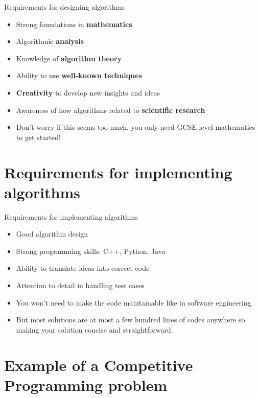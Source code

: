 \documentclass{beamer}
\begin{document}
\begin{frame}{Requirements for designing algorithms}
    \begin{itemize}
        \item Strong foundations in \textbf{mathematics}
        \pause
        \item Algorithmic \textbf{analysis}
        \pause
        \item Knowledge of \textbf{algorithm theory}
        \pause
        \item Ability to use \textbf{well-known techniques}
        \pause
        \item \textbf{Creativity} to develop new insights and ideas
        \pause
        \item Awareness of how algorithms related to \textbf{scientific research}
        \pause
        \item Don’t worry if this seems too much, you only need GCSE level mathematics to get started!
    \end{itemize}
\end{frame}

\section{Requirements for implementing algorithms}

\begin{frame}{Requirements for implementing algorithms}
    \begin{itemize}
        \item Good algorithm design
        \pause
        \item Strong programming skills: C++, Python, Java
        \pause
        \item Ability to translate ideas into correct code
        \pause
        \item Attention to detail in handling test cases
        \pause
        \item You won’t need to make the code maintainable like in software engineering.
        \pause
        \item But most solutions are at most a few hundred lines of codes anywhere so making your solution concise and straightforward.
    \end{itemize}
\end{frame}

\section{Example of a Competitive Programming problem}
\end{document}
